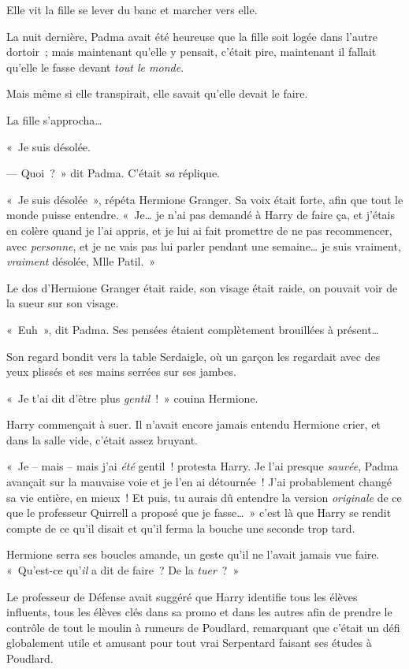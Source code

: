 Elle vit la fille se lever du banc et marcher vers elle.

La nuit dernière, Padma avait été heureuse que la fille soit logée dans l'autre dortoir~; mais maintenant qu'elle y pensait, c'était pire, maintenant il fallait qu'elle le fasse devant \emph{tout le monde}.

Mais même si elle transpirait, elle savait qu'elle devait le faire.

La fille s'approcha…

«~Je suis désolée.

--- Quoi~?~» dit Padma. C'était \emph{sa} réplique.

«~Je suis désolée~», répéta Hermione Granger. Sa voix était forte, afin que tout le monde puisse entendre. «~Je… je n'ai pas demandé à Harry de faire ça, et j'étais en colère quand je l'ai appris, et je lui ai fait promettre de ne pas recommencer, avec \emph{personne}, et je ne vais pas lui parler pendant une semaine… je suis vraiment, \emph{vraiment} désolée, Mlle Patil.~»

Le dos d'Hermione Granger était raide, son visage était raide, on pouvait voir de la sueur sur son visage.

«~Euh~», dit Padma. Ses pensées étaient complètement brouillées à présent…

Son regard bondit vers la table Serdaigle, où un garçon les regardait avec des yeux plissés et ses mains serrées sur ses jambes.


«~Je t'ai dit d'être plus \emph{gentil}~!~» couina Hermione.

Harry commençait à suer. Il n'avait encore jamais entendu Hermione crier, et dans la salle vide, c'était assez bruyant.

«~Je -- mais -- mais j'ai \emph{été} gentil~! protesta Harry. Je l'ai presque \emph{sauvée}, Padma avançait sur la mauvaise voie et je l'en ai détournée~! J'ai probablement changé sa vie entière, en mieux~! Et puis, tu aurais dû entendre la version \emph{originale} de ce que le professeur Quirrell a proposé que je fasse…~» c'est là que Harry se rendit compte de ce qu'il disait et qu'il ferma la bouche une seconde trop tard.

Hermione serra ses boucles amande, un geste qu'il ne l'avait jamais vue faire. «~Qu'est-ce qu'\emph{il} a dit de faire~? De la \emph{tuer}~?~»

Le professeur de Défense avait suggéré que Harry identifie tous les élèves influents, tous les élèves clés dans sa promo et dans les autres afin de prendre le contrôle de tout le moulin à rumeurs de Poudlard, remarquant que c'était un défi globalement utile et amusant pour tout vrai Serpentard faisant ses études à Poudlard.

